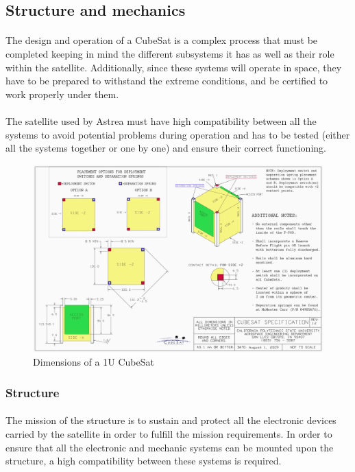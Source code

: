 \subsection{Structure and mechanics}

\paragraph{}The design and operation of a CubeSat is a complex process that must be completed keeping in mind the different subsystems it has as well as their role within the satellite. Additionally, since these systems will operate in space, they have to be prepared to withstand the extreme conditions, and be certified to work properly under them. 

\paragraph{}The satellite used by Astrea must have high compatibility between all the systems to avoid potential problems during operation and has to be tested (either all the systems together or one by one) and ensure their correct functioning.


\begin{figure}[h]
\includegraphics[scale=0.6]{./sections/SatelliteDesign/images/CubeSatDesign}
\centering
\caption{Dimensions of a 1U CubeSat \cite{cubesatdimensions}}
\end{figure}

\subsubsection{Structure}

\paragraph{}The mission of the structure is to sustain and protect all the electronic devices carried by the satellite in order to fulfill the mission requirements. In order to ensure that all the electronic and mechanic systems can be mounted upon the structure, a high compatibility between these systems is required.

